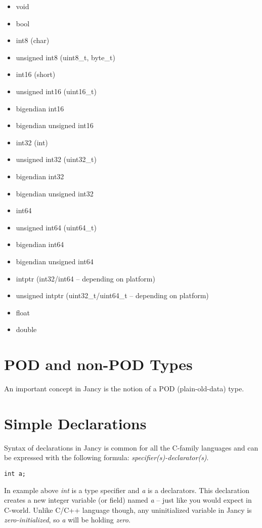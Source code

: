 \documentclass[oneside]{book}
\begin{document}
\begin{itemize}
\item void
\item bool
\item int8 (char)
\item unsigned int8 (uint8\_t, byte\_t)
\item int16 (short)
\item unsigned int16 (uint16\_t)
\item bigendian int16
\item bigendian unsigned int16 
\item int32 (int)
\item unsigned int32 (uint32\_t)
\item bigendian int32
\item bigendian unsigned int32
\item int64
\item unsigned int64 (uint64\_t)
\item bigendian int64
\item bigendian unsigned int64
\item intptr (int32/int64 -- depending on platform)
\item unsigned intptr (uint32\_t/uint64\_t -- depending on platform)
\item float
\item double
\end{itemize}

\section{POD and non-POD Types}

An important concept in Jancy is the notion of a POD (plain-old-data) type.

\section{Simple Declarations}

Syntax of declarations in Jancy is common for all the C-family languages and can be expressed with the following formula: \emph{specifier(s)-declarator(s)}.

\begin{lstlisting}
int a;
\end{lstlisting}

In example above \emph{int} is a type specifier and \emph{a} is a declarators. This declaration creates a new integer variable (or field) named \emph{a} -- just like you would expect in C-world. Unlike C/C++ language though, any uninitialized variable in Jancy is \emph{zero-initialized}, so \emph{a} will be holding \emph{zero}.
\end{document}
